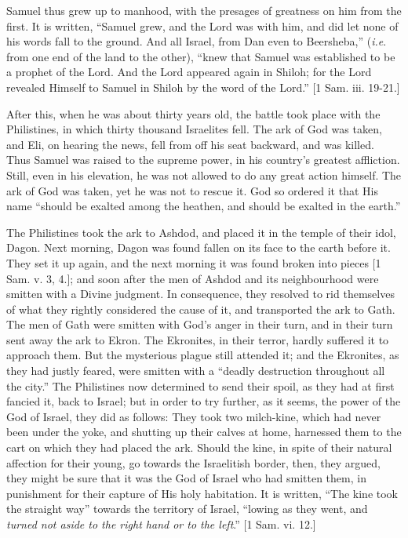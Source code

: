 Samuel thus grew up to manhood, with the presages of greatness on
him from the first. It is written, ``Samuel grew, and the Lord was
with him, and did let none of his words fall to the ground. And all
Israel, from Dan even to Beersheba,'' (\emph{i.e}. from one end of
the land to the other), ``knew that Samuel was established to be a
prophet of the Lord. And the Lord appeared again in Shiloh; for the
Lord revealed Himself to Samuel in Shiloh by the word of the
Lord.'' [1 Sam. iii. 19-21.]

After this, when he was about thirty years old, the battle took
place with the Philistines, in which thirty thousand Israelites fell.
The ark of God was taken, and Eli, on hearing the news, fell from off
his seat backward, and was killed. Thus Samuel was raised to the
supreme power, in his country's greatest affliction. Still, even in
his elevation, he was not allowed to do any great action himself. The
ark of God was taken, yet he was not to rescue it. God so ordered it
that His name ``should be exalted among the heathen, and should be
exalted in the earth.''

The Philistines took the ark to Ashdod, and placed it in the temple
of their idol, Dagon. Next morning, Dagon was found fallen on its face
to the earth before it. They set it up again, and the next morning it
was found broken into pieces [1 Sam. v. 3, 4.]; and soon after the men
of Ashdod and its neighbourhood were smitten with a Divine judgment.
In consequence, they resolved to rid themselves of what they rightly
considered the cause of it, and transported the ark to Gath. The men
of Gath were smitten with God's anger in their turn, and in their
turn sent away the ark to Ekron. The Ekronites, in their terror,
hardly suffered it to approach them. But the mysterious plague still
attended it; and the Ekronites, as they had justly feared, were
smitten with a ``deadly destruction throughout all the city.''
The Philistines now determined to send their spoil, as they had at
first fancied it, back to Israel; but in order to try further, as it
seems, the power of the God of Israel, they did as follows: They took
two milch-kine, which had never been under the yoke, and shutting up
their calves at home, harnessed them to the cart on which they had
placed the ark. Should the kine, in spite of their natural affection
for their young, go towards the Israelitish border, then, they argued,
they might be sure that it was the God of Israel who had smitten them,
in punishment for their capture of His holy habitation. It is written,
``The kine took the straight way'' towards the territory of
Israel, ``lowing as they went, and \emph{turned not aside to the
right hand or to the left}.'' [1 Sam. vi. 12.]

